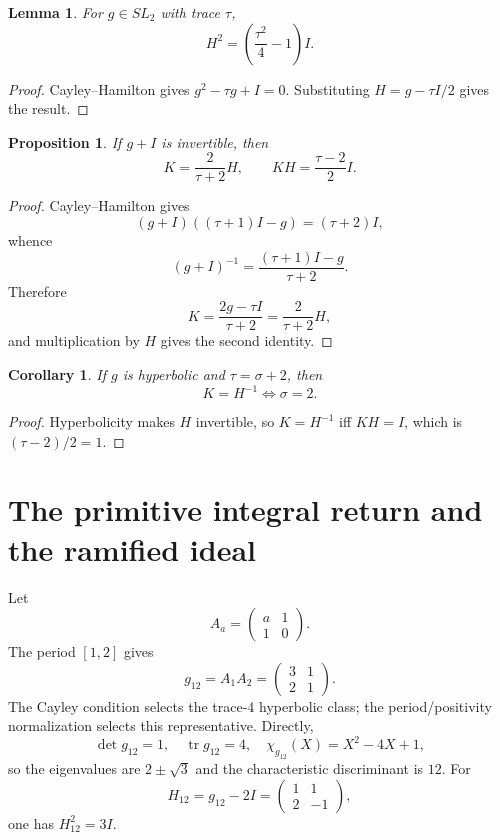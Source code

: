 \documentclass[11pt]{article}
\newtheorem{proposition}[theorem]{Proposition}
\newtheorem{corollary}[theorem]{Corollary}
\newtheorem{lemma}[theorem]{Lemma}
\theoremstyle{remark}
\newcommand{\tr}{\operatorname{tr}}
\begin{document}
\begin{lemma}
For $g\in SL_2$ with trace $\tau$,
\[
H^2=\left(\frac{\tau^2}{4}-1\right)I.
\]
\end{lemma}
\begin{proof}
Cayley--Hamilton gives $g^2-\tau g+I=0$.  Substituting
$H=g-\tau I/2$ gives the result.
\end{proof}

\begin{proposition}
If $g+I$ is invertible, then
\[
K=\frac{2}{\tau+2}H,
\qquad KH=\frac{\tau-2}{2}I.
\]
\end{proposition}
\begin{proof}
Cayley--Hamilton gives
\[
(g+I)((\tau+1)I-g)=(\tau+2)I,
\]
whence
\[
(g+I)^{-1}=\frac{(\tau+1)I-g}{\tau+2}.
\]
Therefore
\[
K=\frac{2g-\tau I}{\tau+2}=\frac{2}{\tau+2}H,
\]
and multiplication by $H$ gives the second identity.
\end{proof}

\begin{corollary}
If $g$ is hyperbolic and $\tau=\sigma+2$, then
\[
K=H^{-1}\iff\sigma=2.
\]
\end{corollary}
\begin{proof}
Hyperbolicity makes $H$ invertible, so $K=H^{-1}$ iff $KH=I$, which is
$(\tau-2)/2=1$.
\end{proof}

\section{The primitive integral return and the ramified ideal}

Let
\[
A_a=\begin{pmatrix}a&1\\1&0\end{pmatrix}.
\]
The period $[1,2]$ gives
\[
g_{12}=A_1A_2=\begin{pmatrix}3&1\\2&1\end{pmatrix}.
\]
The Cayley condition selects the trace-$4$ hyperbolic class; the
period/positivity normalization selects this representative.  Directly,
\[
\det g_{12}=1,
\quad \tr g_{12}=4,
\quad \chi_{g_{12}}(X)=X^2-4X+1,
\]
so the eigenvalues are $2\pm\sqrt3$ and the characteristic discriminant is
$12$.  For
\[
H_{12}=g_{12}-2I=\begin{pmatrix}1&1\\2&-1\end{pmatrix},
\]
one has $H_{12}^2=3I$.
\end{document}
